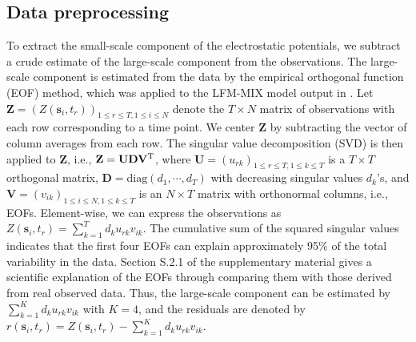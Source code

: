 \documentclass[aoas,preprint]{imsart}
\numberwithin{equation}{section}
\theoremstyle{plain}
\begin{document}
\subsection{Data preprocessing}\label{sec:data_preproc}
To extract the small-scale component of the electrostatic potentials, we subtract a crude estimate of the large-scale component from the observations. The large-scale component is estimated from the data by the empirical orthogonal function (EOF) method, which was applied to the LFM-MIX model output in \citet{kleiber-13}. Let $\mathbf{Z}=(Z(\mathbf{s}_i, t_r))_{1\leq r \leq T,1\leq i\leq N}$ denote the $T \times N$ matrix of observations with each row corresponding to a time point. We center $\mathbf{Z}$ by subtracting the vector of column averages from each row. The singular value decomposition (SVD) is then applied to $\mathbf{Z}$, i.e., $\mathbf{Z}=\mathbf{U}\mathbf{D}\mathbf{V}^{\rm T}$, where $\mathbf{U}=(u_{rk})_{1\leq r \leq T,1\leq k \leq T}$ is a $T\times T$ orthogonal matrix, $\mathbf{D}=\mbox{diag}(d_1, \cdots, d_T)$ with decreasing singular values $d_k$'s, and $\mathbf{V}=(v_{ik})_{1\leq i \leq N,1\leq k \leq T}$ is an $N\times T$ matrix with orthonormal columns, i.e., EOFs. Element-wise, we can express the observations as $Z(\mathbf{s}_i, t_r)=\sum_{k=1}^Td_ku_{rk}v_{ik}$. The cumulative sum of the squared singular values indicates that the first four EOFs can explain approximately 95\% of the total variability in the data. Section S.2.1 of the supplementary material \citep{Fan-17-supp} gives a scientific explanation of the EOFs through comparing them with those derived from real observed data. Thus, the large-scale component can be estimated by $\sum_{k=1}^K d_ku_{rk}v_{ik}$ with $K=4$, and the residuals are denoted by $r(\mathbf{s}_i, t_r)=Z(\mathbf{s}_i, t_r)-\sum_{k=1}^Kd_k u_{rk} v_{ik}$.
\end{document}
